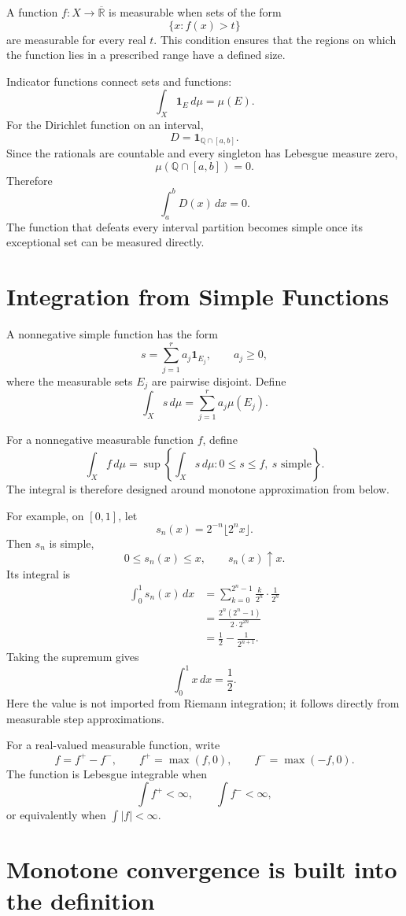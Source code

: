 A function \(f:X\to\overline{\mathbb R}\) is measurable when sets of the form
\[
  \{x:f(x)>t\}
\]
are measurable for every real \(t\).  This condition ensures that the regions on which the function lies in a prescribed range have a defined size.

Indicator functions connect sets and functions:
\[
  \int_X\mathbf1_E\,d\mu=\mu(E).
\]
For the Dirichlet function on an interval,
\[
  D=\mathbf1_{\mathbb Q\cap[a,b]}.
\]
Since the rationals are countable and every singleton has Lebesgue measure zero,
\[
  \mu(\mathbb Q\cap[a,b])=0.
\]
Therefore
\[
  \int_a^b D(x)\,dx=0.
\]
The function that defeats every interval partition becomes simple once its exceptional set can be measured directly.

\section{Integration from Simple Functions}

A nonnegative simple function has the form
\[
  s=\sum_{j=1}^r a_j\mathbf1_{E_j},
  \qquad
  a_j\ge0,
\]
where the measurable sets \(E_j\) are pairwise disjoint.  Define
\[
  \int_X s\,d\mu
  =\sum_{j=1}^r a_j\mu(E_j).
\]

For a nonnegative measurable function \(f\), define
\[
  \boxed{
  \int_X f\,d\mu
  =\sup\left\{
    \int_Xs\,d\mu:
    0\le s\le f,\ s\text{ simple}
  \right\}.}
\]
The integral is therefore designed around monotone approximation from below.

For example, on \([0,1]\), let
\[
  s_n(x)=2^{-n}\lfloor2^n x\rfloor.
\]
Then \(s_n\) is simple,
\[
  0\le s_n(x)\le x,
  \qquad
  s_n(x)\uparrow x.
\]
Its integral is
\[
\begin{aligned}
  \int_0^1s_n(x)\,dx
  &=\sum_{k=0}^{2^n-1}
    \frac{k}{2^n}\cdot\frac1{2^n}\\
  &=\frac{2^n(2^n-1)}{2\cdot2^{2n}}\\
  &=\frac12-\frac1{2^{n+1}}.
\end{aligned}
\]
Taking the supremum gives
\[
  \int_0^1x\,dx=\frac12.
\]
Here the value is not imported from Riemann integration; it follows directly from measurable step approximations.

For a real-valued measurable function, write
\[
  f=f^+-f^-,
  \qquad
  f^+=\max(f,0),
  \qquad
  f^-=\max(-f,0).
\]
The function is Lebesgue integrable when
\[
  \int f^+<\infty,
  \qquad
  \int f^-<\infty,
\]
or equivalently when \(\int|f|<\infty\).

\section{Monotone convergence is built into the definition}

